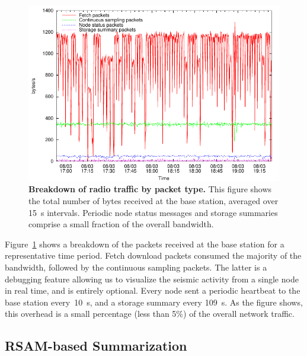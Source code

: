 \begin{figure}[t]
\begin{center}
\includegraphics[width=0.9\hsize]{./4-lance/figs/packetgraph.pdf}
\end{center}

\caption{\textbf{Breakdown of radio traffic by packet type.} This figure
shows the total number of bytes received at the base station, averaged over
15~s intervals. Periodic node status messages and storage summaries comprise
a small fraction of the overall bandwidth.}

\label{lance-fig-packetgraph}
\end{figure}

Figure~\ref{lance-fig-packetgraph} shows a breakdown of the packets received
at the base station for a representative time period. Fetch download packets
consumed the majority of the bandwidth, followed by the continuous sampling
packets. The latter is a debugging feature allowing us to visualize the
seismic activity from a single node in real time, and is entirely optional.
Every node sent a periodic heartbeat to the base station every~10~s, and a
storage summary every 109~s. As the figure shows, this overhead is a small
percentage (less than 5\%) of the overall network traffic.

\subsection{RSAM-based Summarization}


